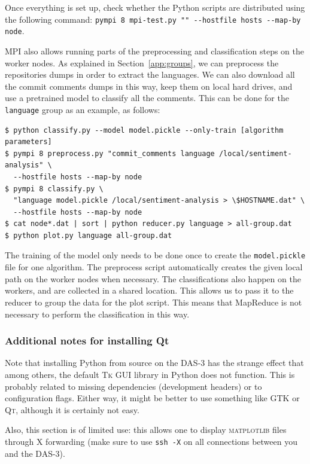 \documentclass{article}
\begin{document}
Once everything is set up, check whether the Python scripts are distributed 
using the following command: \texttt{pympi 8 mpi-test.py "" -{}-hostfile 
hosts -{}-map-by node}.

MPI also allows running parts of the preprocessing and classification steps on 
the worker nodes. As explained in Section~\ref{app:groups}, we can preprocess 
the repositories dumps in order to extract the languages. We can also download 
all the commit comments dumps in this way, keep them on local hard drives, and 
use a pretrained model to classify all the comments. This can be done for the 
\texttt{language} group as an example, as follows:

\begin{verbatim}
$ python classify.py --model model.pickle --only-train [algorithm parameters]
$ pympi 8 preprocess.py "commit_comments language /local/sentiment-analysis" \
  --hostfile hosts --map-by node
$ pympi 8 classify.py \
  "language model.pickle /local/sentiment-analysis > \$HOSTNAME.dat" \
  --hostfile hosts --map-by node
$ cat node*.dat | sort | python reducer.py language > all-group.dat
$ python plot.py language all-group.dat
\end{verbatim}

The training of the model only needs to be done once to create the 
\texttt{model.pickle} file for one algorithm. The preprocess script 
automatically creates the given local path on the worker nodes when necessary. 
The classifications also happen on the workers, and are collected in a shared 
location. This allows us to pass it to the reducer to group the data for the 
plot script. This means that MapReduce is not necessary to perform the 
classification in this way.

\subsubsection{Additional notes for installing Qt}\label{app:qt}
Note that installing Python from source on the DAS-3 has the strange effect 
that among others, the default \textsc{Tk} GUI library in Python does not 
function. This is probably related to missing dependencies (development 
headers) or to configuration flags. Either way, it might be better to use 
something like GTK or \textsc{Qt}, although it is certainly not easy.

Also, this section is of limited use: this allows one to display 
\textsc{matplotlib} files through X forwarding (make sure to use \texttt{ssh 
-X} on all connections between you and the DAS-3).
\end{document}
